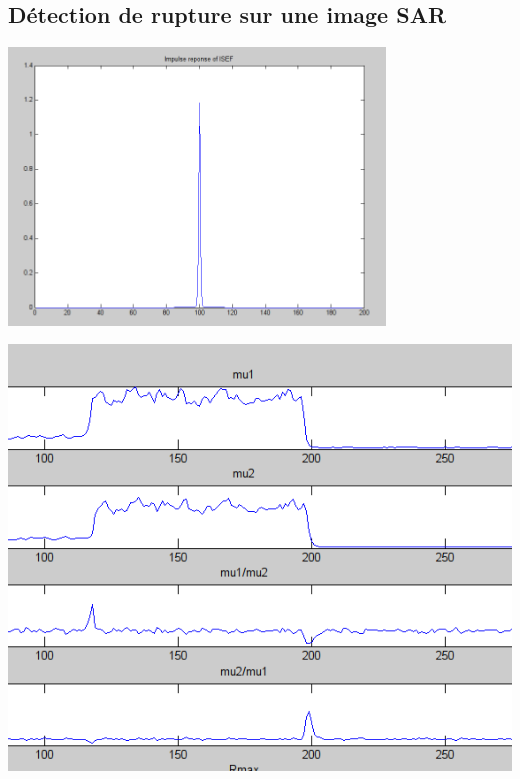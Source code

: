 \documentclass{beamer}
\newcommand{\FSource}[1]{%
  
  }
\begin{document}
\begin{frame}
\section{Détection de rupture sur une image SAR}
\FSource{matlab/isef.m}
\end{frame}

\begin{frame}
\includegraphics[width=10cm]{capture/filtre.png}
\end{frame}

\begin{frame}
\begin{center}
\includegraphics[scale=0.4]{capture/I.png}
\end{center}
\end{frame}
\end{document}
